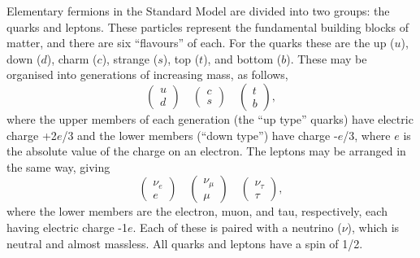 Elementary fermions in the Standard Model are divided into two groups: the quarks and leptons.  These particles represent the fundamental building blocks of matter, and there are six ``flavours'' of each. For the quarks these are the up ($u$), down ($d$), charm ($c$), strange ($s$), top ($t$), and bottom ($b$). These may be organised into generations of increasing mass, as follows,
\begin{equation}
\left( \begin{array}{c} u \\ d \end{array} \right) \quad \left( \begin{array}{c} c \\ s \end{array} \right) \quad \left( \begin{array}{c} t \\ b \end{array} \right), 
\label{SM_quark_doublets}
\end{equation}
where the upper members of each generation (the ``up type'' quarks) have electric charge +2$e$/3 and the lower members (``down type'') have charge -$e$/3, where $e$ is the absolute value of the charge on an electron. The leptons may be arranged in the same way, giving
\begin{equation}
\left( \begin{array}{c} \nu_e \\ e \end{array} \right) \quad \left( \begin{array}{c} \nu_\mu \\ \mu \end{array} \right) \quad \left( \begin{array}{c} \nu_\tau \\ \tau \end{array} \right),
\label{SM_lepton_doublets}
\end{equation}
where the lower members are the electron, muon, and tau, respectively, each having electric charge -1$e$. Each of these is paired with a neutrino ($\nu$), which is neutral and almost massless. All quarks and leptons have a spin of 1/2.

% 
%
%
%
%
%

